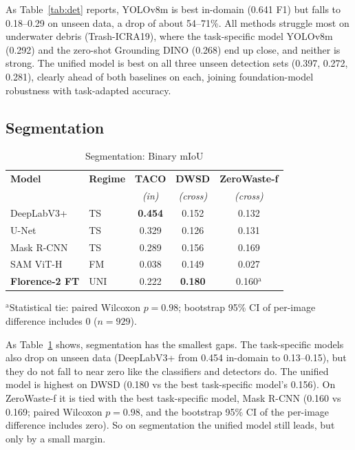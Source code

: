 \documentclass[conference]{IEEEtran}
\begin{document}
As Table~\ref{tab:det} reports, YOLOv8m is best in-domain (0.641 F1) but falls to
0.18--0.29 on unseen data, a drop of about 54--71\%. All methods struggle most on
underwater debris (Trash-ICRA19), where the task-specific model YOLOv8m (0.292)
and
the zero-shot Grounding DINO (0.268) end up close, and neither is strong. The unified
model is best on all three unseen detection sets (0.397, 0.272, 0.281), clearly ahead
of both baselines on each, joining foundation-model robustness with task-adapted
accuracy.

\subsection{Segmentation}
\vspace{-3mm}
\begin{table}[htbp]
\caption{Segmentation: Binary mIoU}
\label{tab:seg}
\begin{center}
\begin{tabular}{@{}llccc@{}}
\toprule
\textbf{Model} & \textbf{Regime} & \textbf{TACO} & \textbf{DWSD} & \textbf{ZeroWaste-f} \\
 & & \textit{(in)} & \textit{(cross)} & \textit{(cross)} \\
\midrule
DeepLabV3+ & TS & \textbf{0.454} & 0.152 & 0.132 \\
U-Net & TS & 0.329 & 0.126 & 0.131 \\
Mask R-CNN & TS & 0.289 & 0.156 & 0.169 \\
SAM ViT-H & FM & 0.038 & 0.149 & 0.027 \\
\textbf{Florence-2 FT} & UNI & 0.222 & \textbf{0.180} & 0.160$^{\mathrm{a}}$ \\
\bottomrule
\end{tabular}
\end{center}
\footnotesize $^{\mathrm{a}}$Statistical tie: paired Wilcoxon $p{=}0.98$; bootstrap 95\% CI of per-image difference includes 0 ($n{=}929$).
\end{table}

As Table~\ref{tab:seg} shows, segmentation has the smallest gaps. The task-specific
models also drop on unseen data
(DeepLabV3+ from 0.454 in-domain to 0.13--0.15), but they do not fall to near zero
like the classifiers and detectors do. The unified model is highest on DWSD (0.180
vs the best task-specific model's 0.156). On ZeroWaste-f it is tied with the best
task-specific model, Mask R-CNN (0.160 vs 0.169; paired Wilcoxon $p{=}0.98$, and the
bootstrap 95\% CI of the per-image difference includes zero). So on segmentation
the unified model still leads, but only by a small margin.
\end{document}
